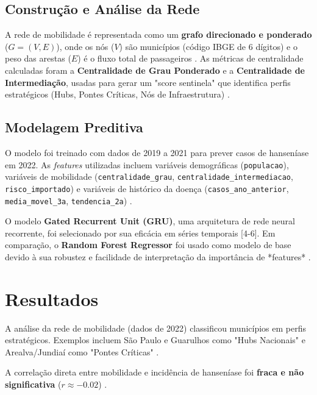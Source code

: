 \documentclass[preprint,12pt]{elsarticle}
\begin{document}
\subsection{Construção e Análise da Rede}

A rede de mobilidade é representada como um \textbf{grafo direcionado e ponderado} ($G=(V, E)$), onde os nós ($V$) são municípios (código IBGE de 6 dígitos) e o peso das arestas ($E$) é o fluxo total de passageiros \cite{inovacao2024modelagem}. As métricas de centralidade calculadas foram a \textbf{Centralidade de Grau Ponderado} e a \textbf{Centralidade de Intermediação}, usadas para gerar um "score sentinela" que identifica perfis estratégicos (Hubs, Pontes Críticas, Nós de Infraestrutura) \cite{inovacao2024modelagem, inovacao2024analise}.

\subsection{Modelagem Preditiva}

O modelo foi treinado com dados de 2019 a 2021 para prever casos de hanseníase em 2022. As \textit{features} utilizadas incluem variáveis demográficas (\texttt{populacao}), variáveis de mobilidade (\texttt{centralidade\_grau}, \texttt{centralidade\_intermediacao}, \texttt{risco\_importado}) e variáveis de histórico da doença (\texttt{casos\_ano\_anterior}, \texttt{media\_movel\_3a}, \texttt{tendencia\_2a}) \cite{inovacao2024modelagem}.

O modelo \textbf{Gated Recurrent Unit (GRU)}, uma arquitetura de rede neural recorrente, foi selecionado por sua eficácia em séries temporais [4-6]. Em comparação, o \textbf{Random Forest Regressor} foi usado como modelo de base devido à sua robustez e facilidade de interpretação da importância de *features* \cite{inovacao2024modelagem, mooney2018big}.

\section{Resultados}

A análise da rede de mobilidade (dados de 2022) classificou municípios em perfis estratégicos. Exemplos incluem São Paulo e Guarulhos como "Hubs Nacionais" e Arealva/Jundiaí como "Pontes Críticas" \cite{inovacao2024modelagem}.

A correlação direta entre mobilidade e incidência de hanseníase foi \textbf{fraca e não significativa} ($r \approx -0.02$) \cite{inovacao2024modelagem, inovacao2024analise}.
\end{document}
